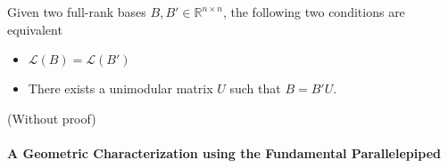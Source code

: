 \begin{theorem}
Given two full-rank bases $B,B'\in \mathbb{R}^{n\times n}$, the following two conditions are equivalent 
    \begin{itemize}
        \item $\mathcal{L}(B)=\mathcal{L}(B')$
        \item There exists a unimodular matrix $U$ such that $B=B'U$.
    \end{itemize}

    (Without proof)
\end{theorem}


\paragraph{A Geometric Characterization using the Fundamental Parallelepiped}
